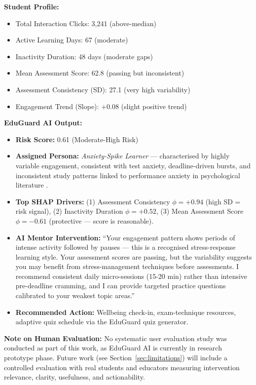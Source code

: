 \textbf{Student Profile:}
\begin{itemize}[nosep]
  \item Total Interaction Clicks: 3,241 (above-median)
  \item Active Learning Days: 67 (moderate)
  \item Inactivity Duration: 48 days (moderate gaps)
  \item Mean Assessment Score: 62.8 (passing but inconsistent)
  \item Assessment Consistency (SD): 27.1 (very high variability)
  \item Engagement Trend (Slope): $+0.08$ (slight positive trend)
\end{itemize}

\textbf{EduGuard AI Output:}
\begin{itemize}[nosep]
  \item \textbf{Risk Score:} 0.61 (Moderate-High Risk)
  \item \textbf{Assigned Persona:} \textit{Anxiety-Spike Learner} —
    characterised by highly variable engagement, consistent with
    test anxiety, deadline-driven bursts, and inconsistent study patterns
    linked to performance anxiety in psychological literature
    \cite{cassady2002cognitive}.
  \item \textbf{Top SHAP Drivers:}
    (1) Assessment Consistency $\phi = +0.94$ (high SD = risk signal),
    (2) Inactivity Duration $\phi = +0.52$,
    (3) Mean Assessment Score $\phi = -0.61$ (protective — score is reasonable).
  \item \textbf{AI Mentor Intervention:}
    ``Your engagement pattern shows periods of intense activity followed by
    pauses — this is a recognised stress-response learning style. Your
    assessment scores are passing, but the variability suggests you may
    benefit from stress-management techniques before assessments.
    I recommend consistent daily micro-sessions (15-20 min) rather than
    intensive pre-deadline cramming, and I can provide targeted practice
    questions calibrated to your weakest topic areas.''
  \item \textbf{Recommended Action:} Wellbeing check-in, exam-technique
    resources, adaptive quiz schedule via the EduGuard quiz generator.
\end{itemize}

\textbf{Note on Human Evaluation:}
No systematic user evaluation study was conducted as part of this
work, as EduGuard AI is currently in research prototype phase.
Future work (see Section~\ref{sec:limitations}) will include a
controlled evaluation with real students and educators measuring
intervention relevance, clarity, usefulness, and actionability.


